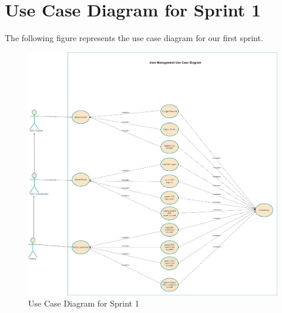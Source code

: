 \section{Use Case Diagram for Sprint 1} 
The following figure represents the use case diagram for our first sprint.
\begin{figure}[h!]
    \centering
    \includegraphics[height=1\textwidth]{images/usecaseS1.png}
    \caption{Use Case Diagram for Sprint 1}
    \label{fig:Use Case Diagram for Sprint 1}
\end{figure}
\newpage 

